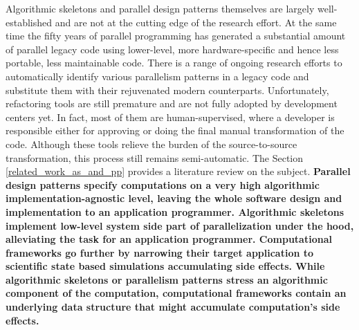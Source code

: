 \quad Algorithmic skeletons and parallel design patterns themselves are largely well-established and are not at the cutting edge of the research effort. At the same time the fifty years of parallel programming has generated a substantial amount of parallel legacy code using lower-level, more hardware-specific and hence less portable, less maintainable code. There is a range of ongoing research efforts to automatically identify various parallelism patterns in a legacy code and substitute them with their rejuvenated modern counterparts. Unfortunately, refactoring tools are still premature and are not fully adopted by development centers yet. In fact, most of them are human-supervised, where a developer is responsible either for approving or doing the final manual transformation of the code. Although these tools relieve the burden of the source-to-source transformation, this process still remains semi-automatic. The Section \ref{related_work_as_and_pp} provides a literature review on the subject.\newline\null
\textbf{\quad Parallel design patterns specify computations on a very high algorithmic implementation-agnostic level, leaving the whole software design and implementation to an application programmer. Algorithmic skeletons implement low-level system side part of parallelization under the hood, alleviating the task for an application programmer. Computational frameworks go further by narrowing their target application to scientific state based simulations accumulating side effects. While algorithmic skeletons or parallelism patterns stress an algorithmic component of the computation, computational frameworks contain an underlying data structure that might accumulate computation's side effects.}
